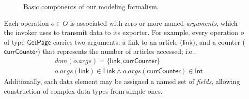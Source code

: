 \begin{figure}[!t]
\caption{Basic components of our modeling formalism.}
\label{fig-formalism}
\end{figure}

Each operation $o \in O$ is associated with zero or more named
\textit{arguments}, which the invoker uses to transmit data to its
exporter. For example, every operation $o$ of type
$\textsf{GetPage}$ carries two arguments: a link to an article
($\textsf{link}$), and a counter ($\textsf{currCounter}$) that
represents the number of articles accessed; i.e.,
\begin{align*}
  &dom(o.args) = \{ \textsf{link}, \textsf{currCounter} \} \\
  &o.args(\textsf{link}) \in \textsf{Link} \land
  o.args(\textsf{currCounter}) \in \textsf{Int}
\end{align*}
Additionally, each data element may be assigned a named set of
\textit{fields}, allowing construction of complex data types from
simple ones.

